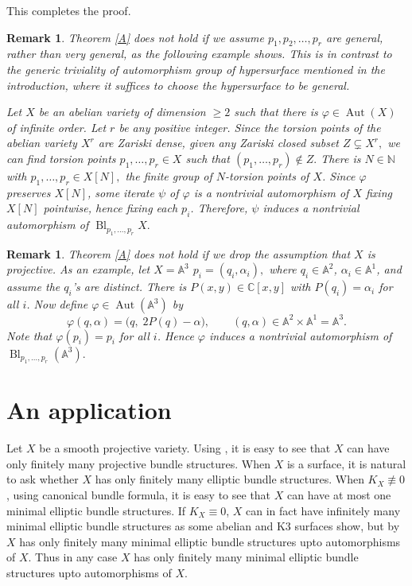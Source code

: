 \documentclass[11pt,letterpaper]{amsart}
\newtheorem{remark}[lemma]{Remark}
\begin{document}
This completes the proof.
\begin{remark}
Theorem \ref{A} does not hold if we assume $p_1,p_2,\ldots,p_r$ are general, rather than very general, as the following example shows. This is in contrast to the generic triviality of automorphism group of hypersurface mentioned in the introduction, where it suffices to choose the hypersurface to be general.

Let \(X\) be an abelian variety of dimension \(\ge 2\) such that there is $\varphi\in\operatorname{Aut}(X)$
of infinite order. Let \(r\) be any positive integer. Since the torsion points of the abelian variety \(X^r\) are Zariski dense, given any  Zariski closed subset $Z\subsetneq X^r,$
we can find torsion points $p_1,\ldots,p_r\in X$
such that $(p_1,\ldots,p_r)\notin Z.$
There is \(N\in\mathbb{N}\) with $p_1,\ldots,p_r\in X[N],$
the finite group of \(N\)-torsion points of $X$.
Since \(\varphi\) preserves \(X[N]\), some iterate $\psi$
of \(\varphi\) is a nontrivial automorphism of \(X\) fixing \(X[N]\) pointwise, hence fixing each \(p_i\). Therefore, \(\psi\) induces a nontrivial automorphism of $\operatorname{Bl}_{p_1,\ldots,p_r}X.$
\end{remark}
\begin{remark}
Theorem \ref{A} does not hold if we drop the assumption that \(X\) is projective. As an example, let $X=\mathbb{A}^3$ $p_i=({q_i},\alpha_i),$
where \({q_i}\in \mathbb{A}^2\), \(\alpha_i\in \mathbb{A}^1\), and assume the \(q_i\)'s are distinct. There is $P(x,y)\in\mathbb{C}[x,y]$
with $P(q_i)=\alpha_i$
for all \(i\). Now define $\varphi\in\operatorname{Aut}(\mathbb{A}^3)$
by
\[
\varphi(q,\alpha)=\bigl(q,\;2P(q)-\alpha\bigr),
\qquad
(q,\alpha)\in \mathbb{A}^2\times \mathbb{A}^1=\mathbb{A}^3.
\]
Note that $\varphi(p_i)=p_i$
for all \(i\). Hence \(\varphi\) induces a nontrivial automorphism of $\operatorname{Bl}_{p_1,\ldots,p_r}(\mathbb{A}^3).$
\end{remark}
\section{An application}
Let $X$ be a smooth projective variety. Using \cite[Theorem 2.2]{wisniewski1991contractions}, it is easy to see that $X$ can have only finitely many projective bundle structures. When $X$ is a surface, it is natural to ask whether $X$ has only finitely many elliptic bundle structures. When $K_X\not\equiv 0$, using canonical bundle formula, it is easy to see that $X$ can have at most one minimal elliptic bundle structures. If $K_X\equiv 0$, $X$ can in fact have infinitely many minimal elliptic bundle structures as some abelian and K3 surfaces show, but by \cite[Theorem 4.1]{Totaro2010ConeConjecture} $X$ has only finitely many minimal elliptic bundle structures upto automorphisms of $X$. Thus in any case $X$ has only finitely many minimal elliptic bundle structures upto automorphisms of $X$.
\end{document}
